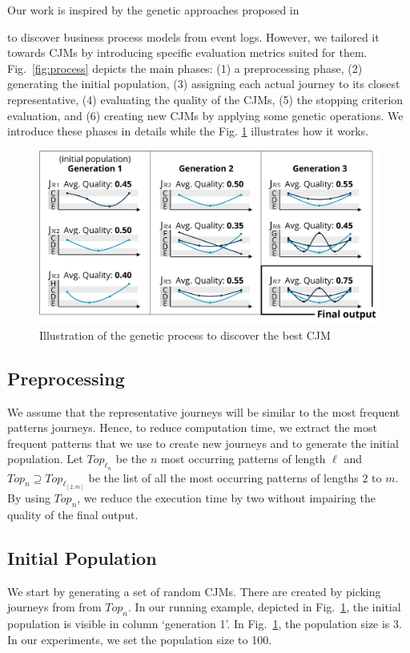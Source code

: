 \documentclass[runningheads]{llncs}
\begin{document}
{Our work is inspired by the genetic approaches proposed in \cite{buijs2012genetic,vazquez2015prodigen,de2005genetic} {to discover business process models from event logs. However, we tailored it towards CJMs by introducing specific evaluation metrics suited for them. Fig.~\ref{fig:process} depicts the main phases: (1) a preprocessing phase, (2) generating the initial population, (3) assigning each actual journey to its closest representative, (4) evaluating the quality of the CJMs, (5) the stopping criterion evaluation, and (6) creating new CJMs by applying some genetic operations. We introduce these phases in details while the Fig. \ref{fig:intuition2} illustrates how it works. 

\begin{figure}
\centering
\includegraphics[width=1\columnwidth]{05_schema/intuition2.pdf}
  \caption{Illustration of the genetic process to discover the best CJM}
  \label{fig:intuition2}
\end{figure}

\subsection{Preprocessing} \label{preprocessing}
We assume that the representative journeys will be similar to the most frequent patterns journeys. Hence, to reduce computation time, we extract the most frequent patterns that we use to create new journeys and to generate the initial population. Let $Top_{\ell_n}$ be the $n$ most occurring patterns of length $\ell$ and $Top_n \supseteq Top_{\ell_{[2,m]}}$ be the list of all the most occurring patterns of lengths $2$ to $m$. By using $Top_n$, we reduce the execution time by two without impairing the quality of the final output.

\subsection{Initial Population}
\label{chap:initial-population}
We start by generating a set of random CJMs. There are created by picking journeys from from $Top_n$. In our running example, depicted in Fig.~\ref{fig:intuition2}, the initial population is visible in column `generation 1'. In Fig.~\ref{fig:intuition2}, the population size is 3. In our experiments, we set the population size to 100. 

}}
\end{document}
